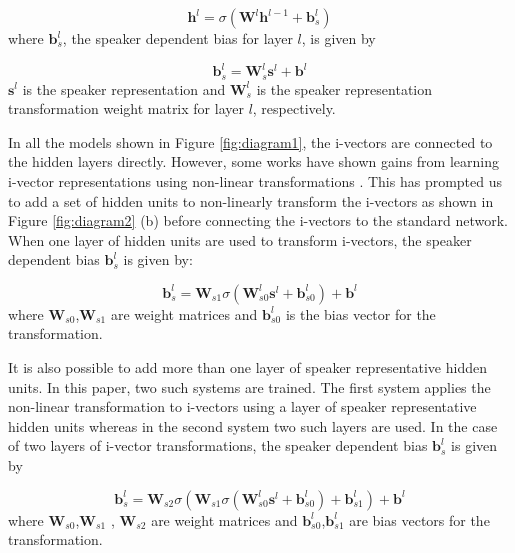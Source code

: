 \documentclass[a4paper]{article}
\begin{document}
   \begin{equation}
   \label{sat1}
   \mathbf{h}^l = \sigma (\mathbf{W}^l \mathbf{h}^{l-1}+ \mathbf{b}_s^l )
   \end{equation} where $\mathbf{b}_s^l$, the speaker dependent bias for layer $l$, is given by
   
   
   \begin{equation}
   \label{sat2}
   \mathbf{b}_s^l =  \mathbf{W}_s^l \mathbf{s}^l + \mathbf{b}^l 
    \end{equation}   $\mathbf{s}^l$ is the speaker representation and  $\mathbf{W}_s^l$ is the speaker representation transformation weight matrix for layer $l$, respectively. 
    
     
   In all the models shown in Figure \ref{fig:diagram1}, the i-vectors are connected to the hidden layers directly.  However, some works have shown gains from learning i-vector representations  using non-linear transformations \cite{IVECDNN}.  This has prompted us to add a set of hidden units to non-linearly transform the i-vectors as shown in Figure \ref{fig:diagram2} (b) before connecting the i-vectors to the standard network.   When one layer of hidden units are used to transform i-vectors, the speaker dependent bias $\mathbf{b}_s^l $ is given by:
   
    \begin{equation}
    \label{sat3}
    \mathbf{b}_s^l =  \mathbf{W}_{s1}  \sigma ( \mathbf{W}_{s0}^l \mathbf{s}^l + \mathbf{b}_{s0}^l )  +   \mathbf{b}^l 
    \end{equation}  where $\mathbf{W}_{s0}$,$\mathbf{W}_{s1}$ are  weight matrices and $\mathbf{b}_{s0}^l $ is the bias vector for the transformation.
   
   It is also possible to add more than one layer of speaker representative hidden units. In this paper, two such systems are trained. The first system applies the non-linear transformation to i-vectors using a layer of  speaker representative hidden units whereas in the second system two such layers are used. In the case of two layers of i-vector transformations, the speaker dependent bias $\mathbf{b}_s^l$ is given by
   
    \begin{equation}
    \label{sat4}
    \mathbf{b}_s^l =  \mathbf{W}_{s2}  \sigma(\mathbf{W}_{s1}  \sigma ( \mathbf{W}_{s0}^l \mathbf{s}^l + \mathbf{b}_{s0}^l  ) + \mathbf{b}_{s1}^l ) +   \mathbf{b}^l 
    \end{equation}  where $\mathbf{W}_{s0}$,$\mathbf{W}_{s1}$ , $\mathbf{W}_{s2}$ are weight matrices and $\mathbf{b}_{s0}^l$,$\mathbf{b}_{s1}^l$ are bias vectors for the transformation. 
   
\end{document}
